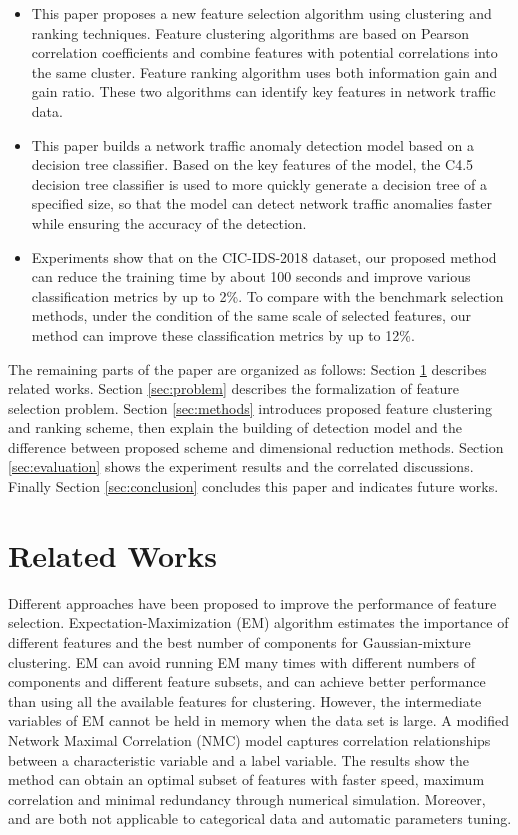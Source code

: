 \documentclass{ieeeaccess}
\theoremstyle{definition}
\begin{document}
\begin{itemize}
    \item This paper proposes a new feature selection algorithm using clustering and ranking techniques. Feature clustering algorithms are based on Pearson correlation coefficients and combine features with potential correlations into the same cluster. Feature ranking algorithm uses both information gain and gain ratio. These two algorithms can identify key features in network traffic data.
    \item This paper builds a network traffic anomaly detection model based on a decision tree classifier. Based on the key features of the model, the C4.5 decision tree classifier is used to more quickly generate a decision tree of a specified size, so that the model can detect network traffic anomalies faster while ensuring the accuracy of the detection.
    \item Experiments show that on the CIC-IDS-2018 dataset, our proposed method can reduce the training time by about 100 seconds and improve various classification metrics by up to 2\%. To compare with the benchmark selection methods, under the condition of the same scale of selected features, our method can improve these classification metrics by up to 12\%.
\end{itemize}

The remaining parts of the paper are organized as follows: Section \ref{sec:related} describes related works. Section \ref{sec:problem} describes the formalization of feature selection problem. Section \ref{sec:methods} introduces proposed feature clustering and ranking scheme, then explain the building of detection model and the difference between proposed scheme and dimensional reduction methods. Section \ref{sec:evaluation} shows the experiment results and the correlated discussions. Finally Section \ref{sec:conclusion} concludes this paper and indicates future works.

\section{Related Works}
\label{sec:related}

Different approaches have been proposed to improve the performance of feature selection. Expectation-Maximization (EM)\cite{Law2004} algorithm estimates the importance of different features and the best number of components for Gaussian-mixture clustering. EM can avoid running EM many times with different numbers of components and different feature subsets, and can achieve better performance than using all the available features for clustering. However, the intermediate variables of EM cannot be held in memory when the data set is large. A modified Network Maximal Correlation (NMC) model\cite{Yang2018} captures correlation relationships between a characteristic variable and a label variable. The results show the method can obtain an optimal subset of features with faster speed, maximum correlation and minimal redundancy through numerical simulation. Moreover, \cite{Law2004} and \cite{Yang2018} are both not applicable to categorical data and automatic parameters tuning.
\end{document}
